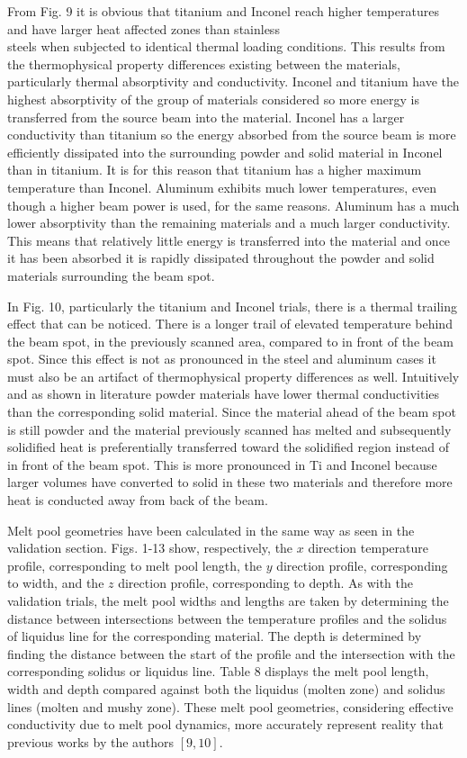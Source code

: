 \documentclass[10pt]{article}
\begin{document}
From Fig. 9 it is obvious that titanium and Inconel reach higher temperatures and have larger heat affected zones than stainless\\
steels when subjected to identical thermal loading conditions. This results from the thermophysical property differences existing between the materials, particularly thermal absorptivity and conductivity. Inconel and titanium have the highest absorptivity of the group of materials considered so more energy is transferred from the source beam into the material. Inconel has a larger conductivity than titanium so the energy absorbed from the source beam is more efficiently dissipated into the surrounding powder and solid material in Inconel than in titanium. It is for this reason that titanium has a higher maximum temperature than Inconel. Aluminum exhibits much lower temperatures, even though a higher beam power is used, for the same reasons. Aluminum has a much lower absorptivity than the remaining materials and a much larger conductivity. This means that relatively little energy is transferred into the material and once it has been absorbed it is rapidly dissipated throughout the powder and solid materials surrounding the beam spot.

In Fig. 10, particularly the titanium and Inconel trials, there is a thermal trailing effect that can be noticed. There is a longer trail of elevated temperature behind the beam spot, in the previously scanned area, compared to in front of the beam spot. Since this effect is not as pronounced in the steel and aluminum cases it must also be an artifact of thermophysical property differences as well. Intuitively and as shown in literature powder materials have lower thermal conductivities than the corresponding solid material. Since the material ahead of the beam spot is still powder and the material previously scanned has melted and subsequently solidified heat is preferentially transferred toward the solidified region instead of in front of the beam spot. This is more pronounced in Ti and Inconel because larger volumes have converted to solid in these two materials and therefore more heat is conducted away from back of the beam.

Melt pool geometries have been calculated in the same way as seen in the validation section. Figs. 1-13 show, respectively, the $x$ direction temperature profile, corresponding to melt pool length, the $y$ direction profile, corresponding to width, and the $z$ direction profile, corresponding to depth. As with the validation trials, the melt pool widths and lengths are taken by determining the distance between intersections between the temperature profiles and the solidus of liquidus line for the corresponding material. The depth is determined by finding the distance between the start of the profile and the intersection with the corresponding solidus or liquidus line. Table 8 displays the melt pool length, width and depth compared against both the liquidus (molten zone) and solidus lines (molten and mushy zone). These melt pool geometries, considering effective conductivity due to melt pool dynamics, more accurately represent reality that previous works by the authors $[9,10]$.
\end{document}
